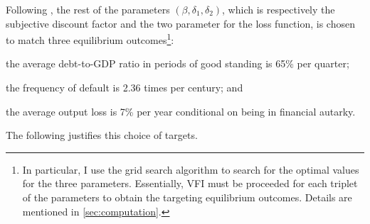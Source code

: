 Following \citet{Na-18}, the rest of the parameters $\left( \beta, \delta_1, \delta_2 \right)$, which is respectively the subjective discount factor and the two parameter for the loss function, is chosen to match three equilibrium outcomes\footnote{
    In particular, I use the grid search algorithm to search for the optimal values for the three parameters. Essentially, VFI must be proceeded for each triplet of the parameters to obtain the targeting equilibrium outcomes. Details are mentioned in \autoref{sec:computation}.
}:
\begin{enumerate*}[label = (\roman*)]
    \item the average debt-to-GDP ratio in periods of good standing is 65\% per quarter;
    \item the frequency of default is 2.36 times per century; and
    \item the average output loss is 7\% per year conditional on being in financial autarky.
\end{enumerate*}
The following justifies this choice of targets.
